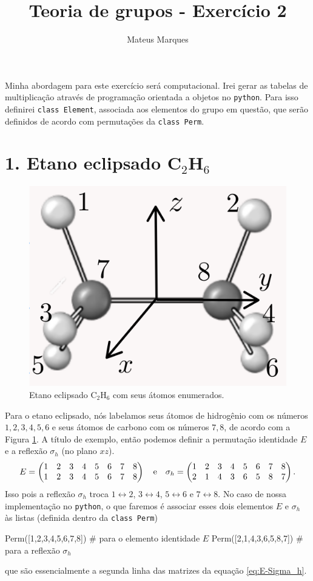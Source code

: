 \documentclass[a4paper,10pt]{article}
\title{\Huge{\textbf{Teoria de grupos - Exercício 2}}}
\author{Mateus Marques}
\newcommand{\python}[1]{\texttt{#1}}
\newcommand{\lr}{\leftrightarrow}
\begin{document}
\maketitle

Minha abordagem para este exercício será computacional. Irei gerar as tabelas de multiplicação através de programação orientada a objetos no \python{python}. Para isso definirei \python{class Element}, associada aos elementos do grupo em questão, que serão definidos de acordo com permutações da \python{class Perm}.


\section*{1. Etano eclipsado C$_2$H$_6$}

\begin{figure}[H]
\centering
\includegraphics[width=0.3\linewidth]{fig/etano_eclipsado.png}
\caption{Etano eclipsado C$_2$H$_6$ com seus átomos enumerados.}
\label{fig:etano_eclipsado}
\end{figure}

Para o etano eclipsado, nós labelamos seus átomos de hidrogênio com os números $1,2,3,4,5,6$ e seus átomos de carbono com os números $7,8$, de acordo com a Figura \ref{fig:etano_eclipsado}. A título de exemplo, então podemos definir a permutação identidade $E$ e a reflexão $\sigma_h$ (no plano $xz$).
\begin{equation} \label{eq:E-Sigma_h}
E =
\begin{pmatrix}
1 & 2 & 3 & 4 & 5 & 6 & 7 & 8 \\
1 & 2 & 3 & 4 & 5 & 6 & 7 & 8 \\
\end{pmatrix}
\quad \mathrm{e} \quad
\sigma_h =
\begin{pmatrix}
1 & 2 & 3 & 4 & 5 & 6 & 7 & 8 \\
2 & 1 & 4 & 3 & 6 & 5 & 8 & 7 \\
\end{pmatrix}.
\end{equation}
Isso pois a reflexão $\sigma_h$ troca $1 \lr 2$, $3 \lr 4$, $5 \lr 6$ e $7 \lr 8$. No caso de nossa implementação no \python{python}, o que faremos é associar esses dois elementos $E$ e $\sigma_h$ às listas (definida dentro da \python{class Perm})
\begin{Python}
Perm([1,2,3,4,5,6,7,8])     # para o elemento identidade $E$
Perm([2,1,4,3,6,5,8,7])     # para a reflexão $\sigma_h$
\end{Python}
que são essencialmente a segunda linha das matrizes da equação \ref{eq:E-Sigma_h}.
\end{document}
